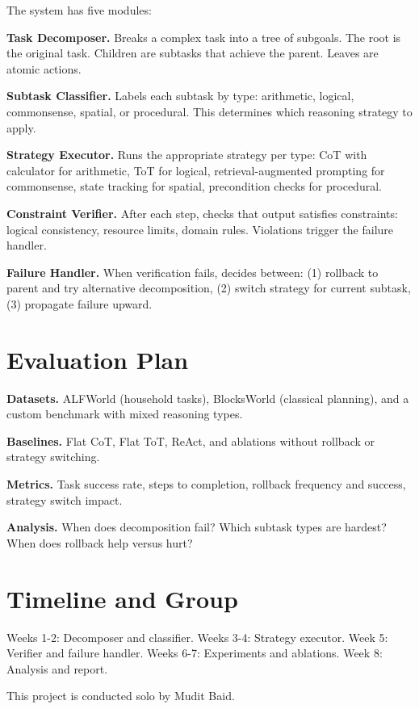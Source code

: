 \documentclass{article}
\begin{document}
The system has five modules:

\textbf{Task Decomposer.} Breaks a complex task into a tree of subgoals. The root is the original task. Children are subtasks that achieve the parent. Leaves are atomic actions.

\textbf{Subtask Classifier.} Labels each subtask by type: arithmetic, logical, commonsense, spatial, or procedural. This determines which reasoning strategy to apply.

\textbf{Strategy Executor.} Runs the appropriate strategy per type: CoT with calculator for arithmetic, ToT for logical, retrieval-augmented prompting for commonsense, state tracking for spatial, precondition checks for procedural.

\textbf{Constraint Verifier.} After each step, checks that output satisfies constraints: logical consistency, resource limits, domain rules. Violations trigger the failure handler.

\textbf{Failure Handler.} When verification fails, decides between: (1) rollback to parent and try alternative decomposition, (2) switch strategy for current subtask, (3) propagate failure upward.

\section{Evaluation Plan}

\textbf{Datasets.} ALFWorld (household tasks), BlocksWorld (classical planning), and a custom benchmark with mixed reasoning types.

\textbf{Baselines.} Flat CoT, Flat ToT, ReAct, and ablations without rollback or strategy switching.

\textbf{Metrics.} Task success rate, steps to completion, rollback frequency and success, strategy switch impact.

\textbf{Analysis.} When does decomposition fail? Which subtask types are hardest? When does rollback help versus hurt?

\section{Timeline and Group}

Weeks 1-2: Decomposer and classifier. Weeks 3-4: Strategy executor. Week 5: Verifier and failure handler. Weeks 6-7: Experiments and ablations. Week 8: Analysis and report.

This project is conducted solo by Mudit Baid.
\end{document}
